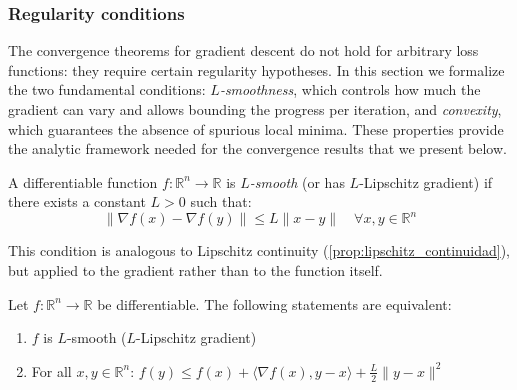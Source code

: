 \subsubsection{Regularity conditions}

The convergence theorems for gradient descent do not hold for arbitrary loss functions: they require certain regularity hypotheses. In this section we formalize the two fundamental conditions: \textit{$L$-smoothness}, which controls how much the gradient can vary and allows bounding the progress per iteration, and \textit{convexity}, which guarantees the absence of spurious local minima. These properties provide the analytic framework needed for the convergence results that we present below.

\begin{definition}\label{def:L_smooth}
	A differentiable function \(f: \mathbb{R}^n \to \mathbb{R}\) is \textit{\(L\)-smooth} (or has \(L\)-Lipschitz gradient) if there exists a constant \(L > 0\) such that:
	\[
		\|\nabla f(x) - \nabla f(y)\| \leq L\|x - y\| \quad \forall x, y \in \mathbb{R}^n
	\]
\end{definition}

This condition is analogous to Lipschitz continuity (\autoref{prop:lipschitz_continuidad}), but applied to the gradient rather than to the function itself.

\begin{proposition}\label{prop:L_smooth_equiv}
	Let \(f: \mathbb{R}^n \to \mathbb{R}\) be differentiable. The following statements are equivalent:
	\begin{enumerate}
		\item \(f\) is \(L\)-smooth (\(L\)-Lipschitz gradient)
		\item For all \(x, y \in \mathbb{R}^n\): \(f(y) \leq f(x) + \langle \nabla f(x), y - x \rangle + \frac{L}{2}\|y - x\|^2\)
	\end{enumerate}
\end{proposition}


